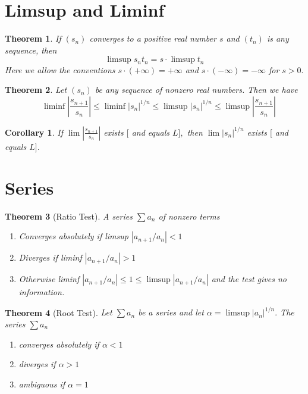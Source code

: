 \documentclass[12pt]{article}
\newtheorem{theorem}{Theorem}[section]
\newtheorem{corollary}{Corollary}[theorem]
\begin{document}
\section{Limsup and Liminf}
\begin{theorem}
	If $\left( s _ { n } \right)$ converges to a positive real number $s$ and $\left( t _ { n } \right)$ is any sequence,
	then $$
	\limsup s _ { n } t _ { n } = s \cdot \limsup t _ { n }
	$$ Here we allow the conventions $s \cdot ( + \infty ) = + \infty$ and $s \cdot ( - \infty ) = - \infty$
	for $s > 0 .$
\end{theorem}
\begin{theorem}
	Let $\left( s _ { n } \right)$ be any sequence of nonzero real numbers. Then we have
	$$\quad \liminf \left| \frac { s _ { n + 1 } } { s _ { n } } \right| \leq \liminf \left| s _ { n } \right| ^ { 1 / n } \leq \limsup \left| s _ { n } \right| ^ { 1 / n } \leq \limsup \left| \frac { s _ { n + 1 } } { s _ { n } } \right|$$
\end{theorem}
\begin{corollary}
	If $\lim \left| \frac { s _ { n + 1 } } { s _ { n } } \right|$ exists $[$ and equals $L ] ,$ then $\lim \left| s _ { n } \right| ^ { 1 / n } $ exists $[$ and
	equals $L ] .$
\end{corollary}
\section{Series}
\begin{theorem}[Ratio Test]
A series $\sum a_{n}$ of nonzero terms
\begin{enumerate}
	\item Converges absolutely if limsup $\left| a _ { n + 1 } / a _ { n } \right| < 1$
	\item Diverges if liminf $\left| a _ { n + 1 } / a _ { n } \right| > 1$
	\item Otherwise liminf $\left| a _ { n + 1 } / a _ { n } \right| \leq 1 \leq \limsup \left| a _ { n + 1 } / a _ { n } \right|$ and the test gives no information.
\end{enumerate}
\end{theorem}

\begin{theorem}[Root Test]
	Let $\sum a _ { n }$ be a series and let $\alpha = \limsup \left| a _ { n } \right| ^ { 1 / n } .$ The series $\sum a _ { n }$ 
	\begin{enumerate}
		\item converges absolutely if $\alpha < 1$
		\item diverges if $\alpha > 1$
		\item ambiguous if $\alpha = 1$
	\end{enumerate}
\end{theorem}
\end{document}
